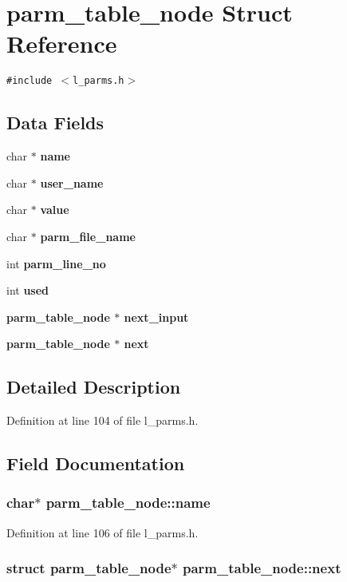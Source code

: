 \section{parm\_\-table\_\-node Struct Reference}
\label{structparm__table__node}
{\tt \#include $<$l\_\-parms.h$>$}

\subsection*{Data Fields}
\begin{CompactItemize}
\item 
char $\ast$ \bf{name}
\item 
char $\ast$ \bf{user\_\-name}
\item 
char $\ast$ \bf{value}
\item 
char $\ast$ \bf{parm\_\-file\_\-name}
\item 
int \bf{parm\_\-line\_\-no}
\item 
int \bf{used}
\item 
\bf{parm\_\-table\_\-node} $\ast$ \bf{next\_\-input}
\item 
\bf{parm\_\-table\_\-node} $\ast$ \bf{next}
\end{CompactItemize}


\subsection{Detailed Description}




Definition at line 104 of file l\_\-parms.h.

\subsection{Field Documentation}
\subsubsection{\setlength{\rightskip}{0pt plus 5cm}char$\ast$ \bf{parm\_\-table\_\-node::name}}\label{structparm__table__node_9904559e76196d8f414d4b0521f258db}




Definition at line 106 of file l\_\-parms.h.
\subsubsection{\setlength{\rightskip}{0pt plus 5cm}struct \bf{parm\_\-table\_\-node}$\ast$ \bf{parm\_\-table\_\-node::next}}\label{structparm__table__node_0512416bb4b0ecaa770d839622f36ad6}




